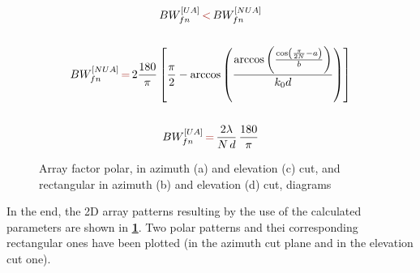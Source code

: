 \documentclass[10 pt,a4paper,twocolumn]{article}
\begin{document}
{\begin{equation}
	\begin{gathered}
		BW_{fn}^{[UA]}\,{\color{Mahogany}<}\,BW_{fn}^{[NUA]}\\
		\\
		BW_{fn}^{[NUA]}\,{\color{Mahogany}=}\,2\frac{180}{\pi}\left[\frac{\pi}{2}-\arccos\left(\frac{\arccos\left(\frac{\cos\left(\frac{\pi}{2N}-a\right)}{b}\right)}{k_0d}\right)\right]\\
		\\
		BW_{fn}^{[UA]}\,{\color{Mahogany}=}\,\frac{2\lambda}{N\,d}\,\frac{180}{\pi}
	\end{gathered}
	\label{eq:tcheby beamwidth}
\end{equation}

\begin{figure}[bt!]
\centering
	\begin{subfigure}[t]{0.35\linewidth}
		\def\svgwidth{\linewidth}
		\tiny{}
		\caption{}
	\end{subfigure}
\hspace{0.05\linewidth}
	\begin{subfigure}[t]{0.45\linewidth}
		\def\svgwidth{\linewidth}
		\tiny{}
		\caption{}
	\end{subfigure}

	\begin{subfigure}[t]{0.35\linewidth}
		\def\svgwidth{\linewidth}
		\tiny{}
		\caption{}
	\end{subfigure}\hspace{0.05\linewidth}
	\begin{subfigure}[t]{0.45\linewidth}
		\def\svgwidth{\linewidth}
		\tiny{}
		\caption{}
	\end{subfigure}

	\caption{{Array factor polar, in azimuth (a) and elevation (c) cut, and rectangular  in azimuth (b) and elevation (d) cut, diagrams}}
	\label{fig:array factor}
\end{figure}


\indent

In the end, the 2D array patterns resulting by the use of the calculated parameters are shown in \textbf{\cref{fig:array factor}}. Two polar patterns and thei corresponding rectangular ones have been plotted (in the azimuth cut plane and in the elevation cut one). 

}
\end{document}
